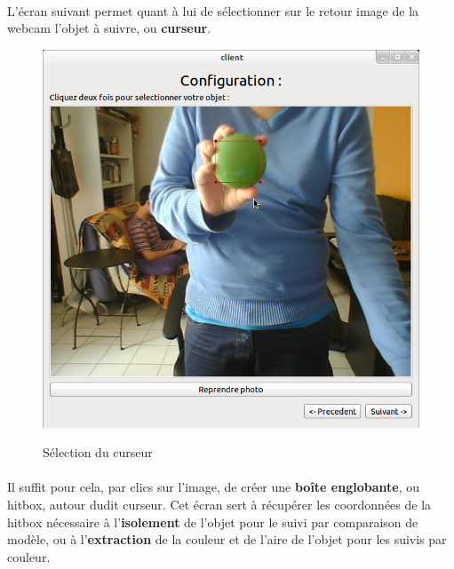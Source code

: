 \documentclass{report}
\begin{document}
				\paragraph{}
				L'écran suivant permet quant à lui de sélectionner sur le retour image de la webcam l'objet à suivre, ou \textbf{curseur}.\\
				\begin{figure}[!h]
						\centering
						\includegraphics[scale=0.35]{../images/Capture1.png}\\
						\caption{Sélection du curseur}
						\label{Sélection du curseur}
				\end{figure}
				\paragraph{}
				Il suffit pour cela, par clics sur l'image, de créer une \textbf{boîte englobante}, ou hitbox, autour dudit curseur.
				Cet écran sert à récupérer les coordonnées de la hitbox nécessaire à l'\textbf{isolement} de l'objet pour le suivi par comparaison de modèle, ou à l'\textbf{extraction} de la couleur et de l'aire de l'objet pour les suivis par couleur.
				\newpage
\end{document}
